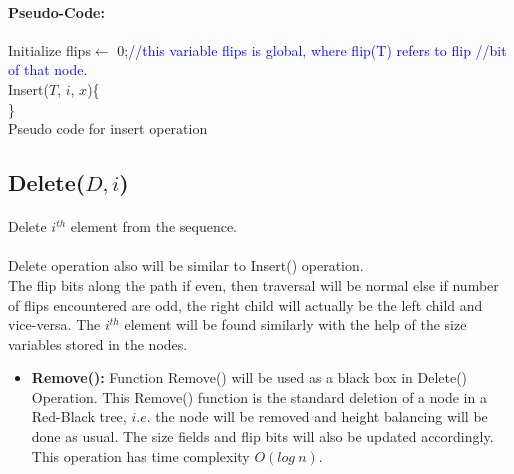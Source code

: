 \documentclass[pdftex,a4paper,12pt]{report}
\begin{document}
\paragraph{Pseudo-Code:}
\begin{algorithm}
Initialize flips$\gets$ 0;\makebox[40pt]{}\textcolor{blue}{//this variable flips is global, where flip(T) refers to
 flip \makebox[150pt]{} //bit of that node.}\\
Insert($T$, $i$, $x$)\{\\
\}\\
\caption{Pseudo code for insert operation}
\end{algorithm}

\newpage
\subsection{Delete($D, i$)}
\paragraph{} Delete $i^{th}$ element from the sequence.\\\\
Delete operation also will be similar to Insert() operation.\\
The flip bits along the path if even, then traversal will be normal else if number of flips 
encountered are odd, the right child will actually be the left child and vice-versa. 
The $i^{th}$ element will be found similarly with the help of the size variables stored in the nodes.
\begin{itemize}
	\item \textbf{Remove():} Function Remove() will be used as a black box in Delete() Operation. This Remove() function
	is the standard deletion of a node in a Red-Black tree, $i.e.$ the node will be removed and height balancing will be 
	done as usual. The size fields and flip bits will also be updated accordingly. This operation has time complexity 
	$O(log\ n)$.
\end{itemize}
\end{document}
